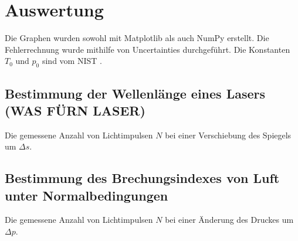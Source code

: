\section{Auswertung}
\label{sec:Auswertung}


Die Graphen wurden sowohl mit Matplotlib \cite{matplotlib} als auch NumPy \cite{numpy} erstellt. Die
Fehlerrechnung wurde mithilfe von Uncertainties \cite{uncertainties} durchgeführt.
Die Konstanten $T_0$ und $p_0$ sind vom NIST \cite{nistgov}.

\subsection{Bestimmung der Wellenlänge eines Lasers (WAS FÜRN LASER)}
\begin{table}
	\centering
	\caption{Die gemessene Anzahl von Lichtimpulsen $N$ bei einer Verschiebung des Spiegels um $\Delta s$.}
	
	\label{tab:a}
\end{table}


\subsection{Bestimmung des Brechungsindexes von Luft unter Normalbedingungen}
\begin{table}
	\centering
	\caption{Die gemessene Anzahl von Lichtimpulsen $N$ bei einer Änderung des Druckes um $\Delta p$.}
	
	\label{tab:b}
\end{table}


